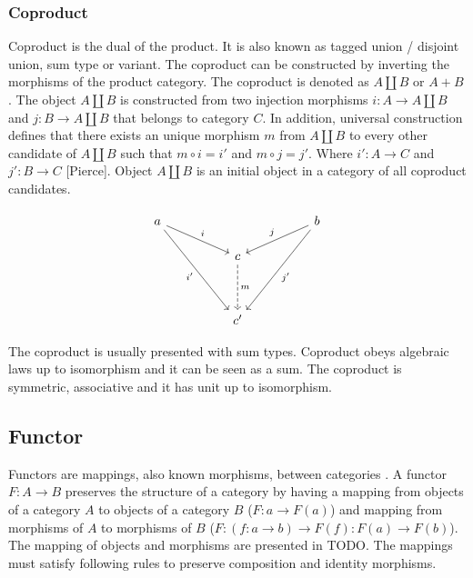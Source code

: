 \documentclass[article]{aaltoseries}
\begin{document}

  \subsubsection{Coproduct}
    Coproduct is the dual of the product. It is also known as tagged union /
    disjoint union, sum type or variant. The coproduct can be constructed by
    inverting the morphisms of the product category. The coproduct is denoted as
    $A \amalg B$ or $A + B$. The object $A \amalg B$ is constructed from two injection morphisms
    $i : A \rightarrow A \amalg B$ and $j : B \rightarrow A \amalg B$ that belongs to category $C$. In addition,
    universal construction defines that there exists an unique morphism $m$ from $A
    \amalg B$ to every other candidate of $A \amalg B$ such that $m \circ i = i'$ and $m \circ j = j'$.
    Where $i' : A \rightarrow C$ and $j' : B \rightarrow C$ [Pierce]. Object $A \amalg B$ is an initial object
    in a category of all coproduct candidates.

    \[
      \begin{tikzcd}[row sep=huge, column sep=huge]
        a \arrow[dr, "i"]
        \arrow[ddr, "i'"']
        &
        & b \arrow[dl, "j"']
        \arrow[ddl, "j'"] \\
        [-2em] & c \arrow[d, dashed, "m"]
        & \\
        & c'
        &
      \end{tikzcd}
    \]

    The coproduct is usually presented with sum types. Coproduct obeys algebraic
    laws up to isomorphism and it can be seen as a sum. The coproduct is
    symmetric, associative and it has unit up to isomorphism.
    

  \subsection{Functor}
    Functors are mappings, also known morphisms, between categories
    \cite{computational, barr1990category, mac2013categories}. A functor $F: A
    \rightarrow B$ preserves the structure of a category by having a mapping from objects
    of a category $A$ to objects of a category $B$ ($F: a \rightarrow F(a)$) and mapping from
    morphisms of $A$ to morphisms of $B$ ($F: (f: a \rightarrow b) \rightarrow F(f): F(a) \rightarrow F(b)$). The
    mapping of objects and morphisms are presented in TODO. The mappings
    must satisfy following rules to preserve composition and identity morphisms.
\end{document}
